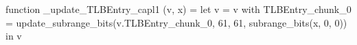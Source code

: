 function _update_TLBEntry_capl1 (v, x) = let v = { v with TLBEntry_chunk_0 = update_subrange_bits(v.TLBEntry_chunk_0, 61, 61, subrange_bits(x, 0, 0)) } in
  v
